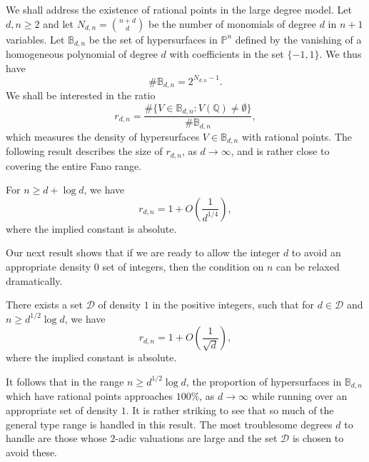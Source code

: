 \documentclass[11pt, reqno]{amsart}
\numberwithin{equation}{section}
\renewcommand{\geq}{\geqslant}
\begin{document}
We shall address the existence of rational points  in  the large degree model. 
Let $d, n \geq 2$ and let $N_{d,n} = \binom{n+d}{d}$ be the number of monomials of degree $d$ in $n+1$ variables. Let  $\mathbb{B}_{d,n}$ be the set of hypersurfaces in $\mathbb{P}^n$ defined by the vanishing of a homogeneous polynomial of degree $d$ with coefficients in the set $\{-1, 1\}$. We thus have
\begin{equation}
\label{Cardinality Bdn}
\# \mathbb{B}_{d,n} = 2^{N_{d,n}-1}.
\end{equation}
We shall be interested in the ratio
\begin{equation*}
r_{d,n} = \frac{\# \{ V \in \mathbb{B}_{d,n} : V(\mathbb{Q}) \neq \emptyset \}}{\# \mathbb{B}_{d,n}},
\end{equation*}
which  measures the density of  hypersurfaces $V\in \mathbb{B}_{d,n} $ with rational points. 
The following result describes the size  of $r_{d,n}$, as $d\to \infty$, and 
is rather close to covering  the entire  Fano range. 


\begin{theorem}
\label{Theorem all d}
For $n \geq d+\log d$, we have
\begin{equation*}
r_{d,n} = 1+ O \left( \frac1{d^{1/4}} \right),
\end{equation*}
where the implied constant is absolute.
\end{theorem}

Our next result shows that if we are ready to allow the integer $d$ to avoid an appropriate 
density $0$ set of integers, then the condition on $n$ can be  relaxed dramatically.

\begin{theorem}
\label{Theorem almost all d}
There exists a set $\mathcal{D}$ of density $1$ in the positive integers, such that for $d \in \mathcal{D}$ and 
$n \geq d^{1/2}\log d$, we have
\begin{equation*}
r_{d,n} = 1 + O \left( \frac{1}{\sqrt{d}}\right),
\end{equation*}
where the implied constant is absolute.
\end{theorem}

It follows that in the range $n \geq d^{1/2}\log d$, the proportion of hypersurfaces in $\mathbb{B}_{d,n}$ which have rational points  approaches $100\%$, as $d \to \infty$ while running over an appropriate set of density $1$. It is rather  striking to see that so much of the general type range is handled in this result.  The most troublesome degrees  $d$ to handle are those whose  $2$-adic valuations are large and the set  $\mathcal{D}$ is chosen to avoid these. 
\end{document}

